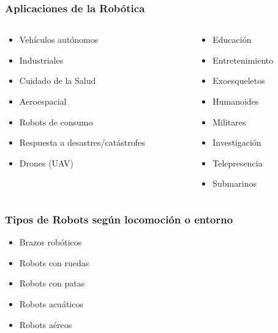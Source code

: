 \begin{frame}
    \frametitle{Aplicaciones de la Robótica}

    \begin{columns}[T] %
        \begin{column}{.48\textwidth}
            \begin{itemize}
                \item Vehículos autónomos
                \item Industriales
                \item Cuidado de la Salud
                \item Aeroespacial
                \item Robots de consumo
                \item Respuesta a desastres/catástrofes
                \item Drones (UAV)
            \end{itemize}
        \end{column}%
        \hfill%
        \begin{column}{.48\textwidth}
            \begin{itemize}
                \item Educación
                \item Entretenimiento
                \item Exoesqueletos
                \item Humanoides
                \item Militares
                \item Investigación
                \item Telepresencia
                \item Submarinos
            \end{itemize}
        \end{column}%
    \end{columns}

\end{frame}

\begin{frame}
    \frametitle{Tipos de Robots según locomoción o entorno}

    \begin{itemize}
        \item Brazos robóticos
        \item Robots con ruedas
        \item Robots con patas
        \item Robots acuáticos
        \item Robots aéreos
    \end{itemize}

\end{frame}


